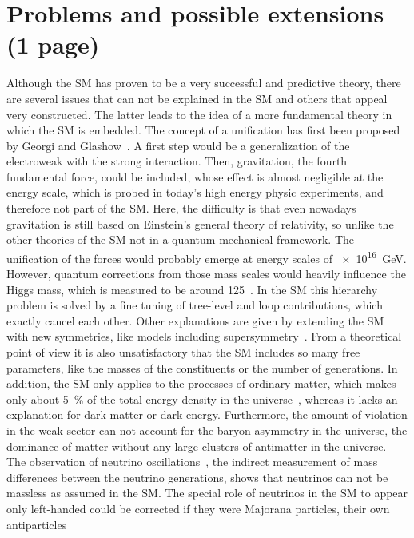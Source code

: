 
\section{Problems and possible extensions (1 page)}
\label{sec:standardmodel:extensions}

Although the SM has proven to be a very successful and predictive theory,
there are several issues that can not be explained in the SM and others that
appeal very constructed. The latter leads to the idea of a more fundamental
theory in which the SM is embedded. The concept of a unification has first
been proposed by Georgi and Glashow~\cite{Georgi:1974sy}. A first step would
be a generalization of the electroweak with the strong interaction. Then,
gravitation, the fourth fundamental force, could be included, whose effect is
almost negligible at the energy scale, which is probed in today's high energy
physic experiments, and therefore not part of the SM. Here, the difficulty is
that even nowadays gravitation is still based on Einstein's general theory of
relativity, so unlike the other theories of the SM not in a quantum mechanical
framework. The unification of the forces would probably emerge at energy
scales of \SI{e16}{\GeV}. However, quantum corrections from those mass scales
would heavily influence the Higgs mass, which is measured to be around
\SI{125}{\GeVcc}~\cite{HiggsMass}. In the SM this hierarchy problem is
solved by a fine tuning of tree-level and loop contributions, which exactly
cancel each other. Other explanations are given by extending the SM with new
symmetries, like models including
supersymmetry~\cite{Gervais:1971ji,Golfand:1971iw,Volkov:1972jx,*Volkov:1973ix}.
From a theoretical point of view it is also unsatisfactory that the SM
includes so many free parameters, like the masses of the constituents or the
number of generations. In addition, the SM only applies to the processes of
ordinary matter, which makes only about \SI{5}{\percent} of the total energy
density in the universe~\cite{Ade:2015xua}, whereas it lacks an explanation
for dark matter or dark energy. Furthermore, the amount of \CP violation in
the weak sector can not account for the baryon asymmetry in the universe, \ie
the dominance of matter without any large clusters of antimatter in the
universe. The observation of neutrino
oscillations~\cite{Fukuda:1998mi,Ahmad:2001an,*Ahmad:2002jz}, \ie the indirect
measurement of mass differences between the neutrino generations, shows that
neutrinos can not be massless as assumed in the SM. The special role of
neutrinos in the SM to appear only left-handed could be corrected if they were
Majorana particles, \ie their own antiparticles~\cite{Majorana:1937vz}
